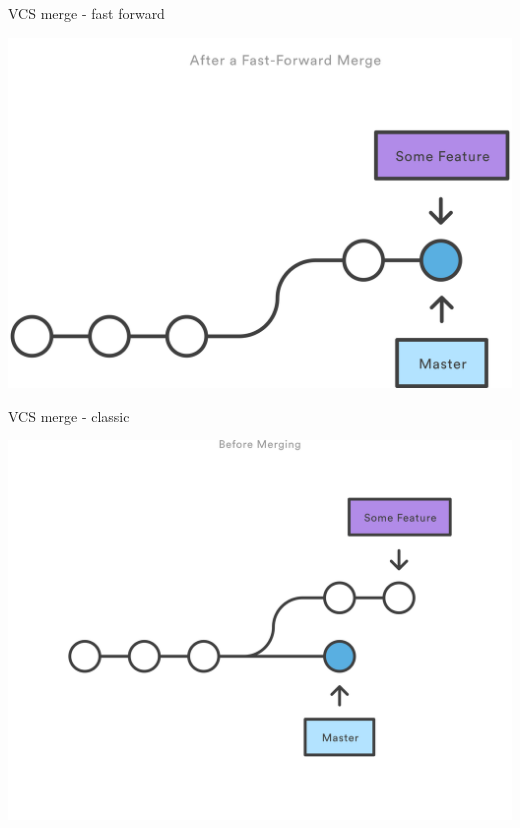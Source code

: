 \begin{frame}[fragile]{VCS merge - fast forward}

\begin{center}
\includegraphics[width=\textwidth]{git-merge-ff2}
\end{center}

\end{frame}


\begin{frame}[fragile]{VCS merge - classic}

\begin{center}
\includegraphics[width=\textwidth]{git-merge-nff}
\end{center}

\end{frame}

